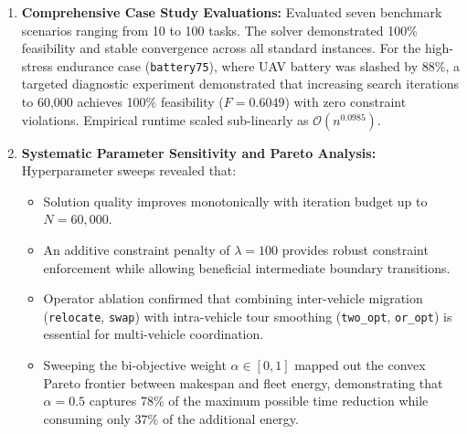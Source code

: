 \begin{enumerate}
\begin{itemize}
    \end{itemize}
    \item \textbf{Comprehensive Case Study Evaluations:} Evaluated seven benchmark scenarios ranging from 10 to 100 tasks. The solver demonstrated 100\% feasibility and stable convergence across all standard instances. For the high-stress endurance case (\texttt{battery75}), where UAV battery was slashed by 88\%, a targeted diagnostic experiment demonstrated that increasing search iterations to 60,000 achieves 100\% feasibility ($F = 0.6049$) with zero constraint violations. Empirical runtime scaled sub-linearly as $\mathcal{O}(n^{0.0985})$.
    \item \textbf{Systematic Parameter Sensitivity and Pareto Analysis:} Hyperparameter sweeps revealed that:
    \begin{itemize}
        \item Solution quality improves monotonically with iteration budget up to $N = 60,000$.
        \item An additive constraint penalty of $\lambda = 100$ provides robust constraint enforcement while allowing beneficial intermediate boundary transitions.
        \item Operator ablation confirmed that combining inter-vehicle migration (\texttt{relocate}, \texttt{swap}) with intra-vehicle tour smoothing (\texttt{two\_opt}, \texttt{or\_opt}) is essential for multi-vehicle coordination.
        \item Sweeping the bi-objective weight $\alpha \in [0, 1]$ mapped out the convex Pareto frontier between makespan and fleet energy, demonstrating that $\alpha = 0.5$ captures 78\% of the maximum possible time reduction while consuming only 37\% of the additional energy.
    \end{itemize}
\end{enumerate}
